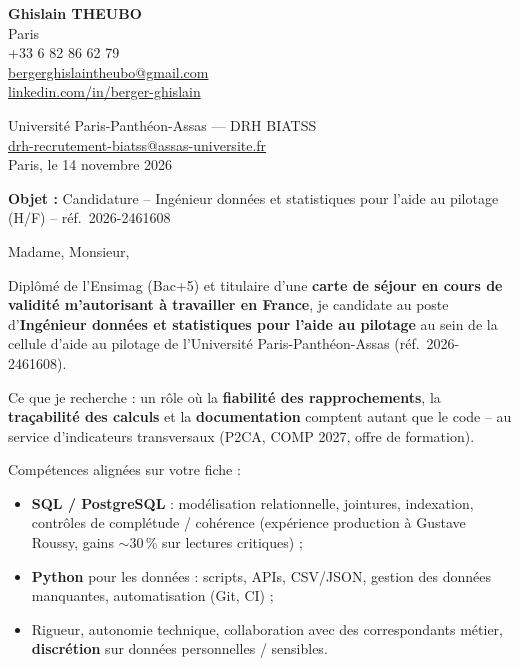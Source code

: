 \documentclass[11pt,a4paper]{article}
\begin{document}

\noindent\textbf{Ghislain THEUBO}\\
Paris\\
+33 6 82 86 62 79\\
\href{mailto:bergerghislaintheubo@gmail.com}{bergerghislaintheubo@gmail.com}\\
\href{https://www.linkedin.com/in/berger-ghislain}{linkedin.com/in/berger-ghislain}

\vspace{0.8em}
\begin{flushright}
Universit\'e Paris-Panth\'eon-Assas --- DRH BIATSS\\
\href{mailto:drh-recrutement-biatss@assas-universite.fr}{drh-recrutement-biatss@assas-universite.fr}\\
Paris, le 14 novembre 2026
\end{flushright}

\vspace{0.6em}
\noindent\textbf{Objet :} Candidature -- Ing\'enieur donn\'ees et statistiques pour l'aide au pilotage (H/F) -- r\'ef.\ 2026-2461608

\vspace{1em}
\noindent Madame, Monsieur,

\vspace{0.6em}
\noindent Dipl\^om\'e de l'Ensimag (Bac+5) et titulaire d'une \textbf{carte de s\'ejour en cours de validit\'e m'autorisant \`a travailler en France}, je candidate au poste d'\textbf{Ing\'enieur donn\'ees et statistiques pour l'aide au pilotage} au sein de la cellule d'aide au pilotage de l'Universit\'e Paris-Panth\'eon-Assas (r\'ef.\ 2026-2461608).

\vspace{0.5em}
\noindent Ce que je recherche : un r\^ole o\`u la \textbf{fiabilit\'e des rapprochements}, la \textbf{tra\c{c}abilit\'e des calculs} et la \textbf{documentation} comptent autant que le code -- au service d'indicateurs transversaux (P2CA, COMP 2027, offre de formation).

\vspace{0.5em}
\noindent Comp\'etences align\'ees sur votre fiche :
\begin{itemize}
  \item \textbf{SQL / PostgreSQL} : mod\'elisation relationnelle, jointures, indexation, contr\^oles de compl\'etude / coh\'erence (exp\'erience production \`a Gustave Roussy, gains $\sim$30\,\% sur lectures critiques) ;
  \item \textbf{Python} pour les donn\'ees : scripts, APIs, CSV/JSON, gestion des donn\'ees manquantes, automatisation (Git, CI) ;
  \item Rigueur, autonomie technique, collaboration avec des correspondants m\'etier, \textbf{discr\'etion} sur donn\'ees personnelles / sensibles.
\end{itemize}
\end{document}
